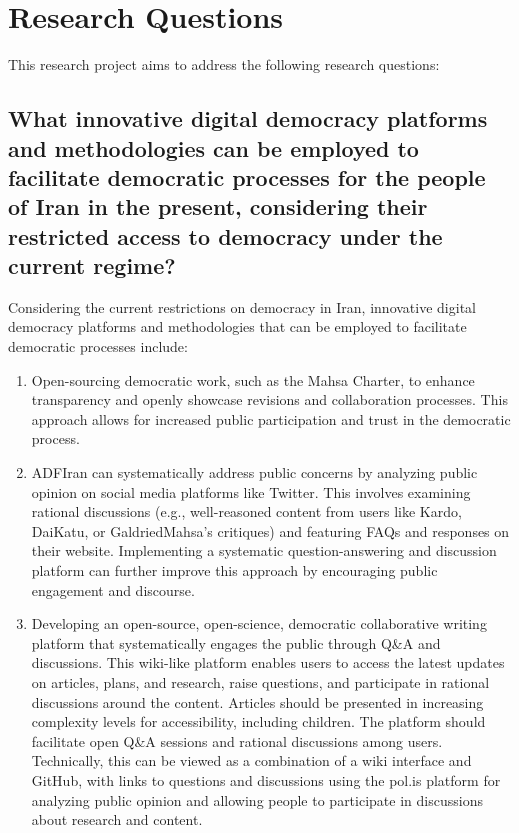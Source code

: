 \documentclass{IEEEtran}
\begin{document}
\section{Research Questions}

This research project aims to address the following research questions:

\subsection{What innovative digital democracy platforms and methodologies can be employed to facilitate democratic processes for the people of Iran in the present, considering their restricted access to democracy under the current regime?}

Considering the current restrictions on democracy in Iran, innovative digital democracy platforms and methodologies that can be employed to facilitate democratic processes include:

\begin{enumerate}
\item Open-sourcing democratic work, such as the Mahsa Charter, to enhance transparency and openly showcase revisions and collaboration processes. This approach allows for increased public participation and trust in the democratic process.
\item ADFIran can systematically address public concerns by analyzing public opinion on social media platforms like Twitter. This involves examining rational discussions (e.g., well-reasoned content from users like Kardo, DaiKatu, or GaldriedMahsa's critiques) and featuring FAQs and responses on their website. Implementing a systematic question-answering and discussion platform can further improve this approach by encouraging public engagement and discourse.
\item Developing an open-source, open-science, democratic collaborative writing platform that systematically engages the public through Q&A and discussions. This wiki-like platform enables users to access the latest updates on articles, plans, and research, raise questions, and participate in rational discussions around the content. Articles should be presented in increasing complexity levels for accessibility, including children. The platform should facilitate open Q&A sessions and rational discussions among users. Technically, this can be viewed as a combination of a wiki interface and GitHub, with links to questions and discussions using the pol.is platform for analyzing public opinion and allowing people to participate in discussions about research and content.
\end{enumerate}
\end{document}
